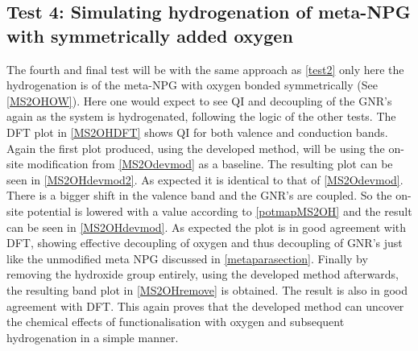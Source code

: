 \subsection{Test 4: Simulating hydrogenation of meta-NPG with symmetrically added oxygen}\label{test4}
The fourth and final test will be with the same approach as \cref{test2} only here the hydrogenation is of the meta-NPG with oxygen bonded symmetrically (See \cref{MS2OHOW}). Here one would expect to see QI and decoupling of the GNR's again as the system is hydrogenated, following the logic of the other tests. The DFT plot in \cref{MS2OHDFT} shows QI for both valence and conduction bands. Again the first plot produced, using the developed method, will be using the on-site modification from \cref{MS2Odevmod} as a baseline. The resulting plot can be seen in \cref{MS2OHdevmod2}. As expected it is identical to that of \cref{MS2Odevmod}. There is a bigger shift in the valence band and the GNR's are coupled. So the on-site potential is lowered with a value according to \cref{potmapMS2OH} and the result can be seen in \cref{MS2OHdevmod}. As expected the plot is in good agreement with DFT, showing effective decoupling of oxygen and thus decoupling of GNR's just like the unmodified meta NPG discussed in \cref{metaparasection}. Finally by removing the hydroxide group entirely, using the developed method afterwards, the resulting band plot in \cref{MS2OHremove} is obtained. The result is also in good agreement with DFT. This again proves that the developed method can uncover the chemical effects of functionalisation with oxygen and subsequent hydrogenation in a simple manner.
